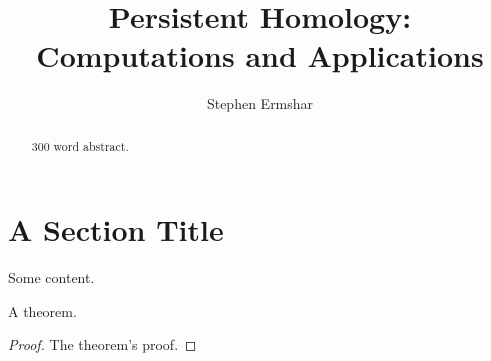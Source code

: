 

\title{Persistent Homology: Computations and Applications}
\author{Stephen Ermshar}



\begin{abstract}
    300 word abstract.
\end{abstract}
\maketitle

\section{A Section Title}

Some content.

\begin{theorem}\label{obvious}
    A theorem.
\end{theorem}

\begin{proof}
    The theorem's proof.
\end{proof}


